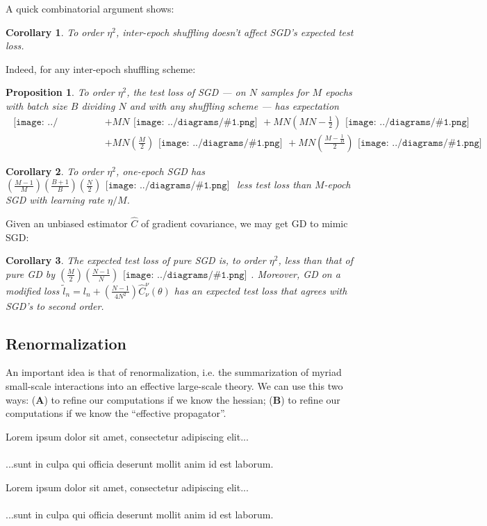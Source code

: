 \documentclass{article}
\newtheorem{cor}{Corollary}
\newtheorem{prop}{Proposition}
\newcommand{\wrap}[1]{\left( #1 \right)}
\newcommand{\mdia}[1]{\begin{gathered}\texttt{[image: ../diagrams/\#1.png]}\end{gathered}}
\newcommand{\sdia}[1]{\begin{gathered}\texttt{[image: ../diagrams/\#1.png]}\end{gathered}}
\newcommand{\lorem}[1]{
    Lorem ipsum dolor sit amet, consectetur adipiscing elit...\\
    \nopagebreak\vspace{#1cm} \ \\
    ...sunt in culpa qui officia deserunt mollit anim id est laborum.
}
\begin{document}
    A quick combinatorial argument shows:
    \begin{cor}
        To order $\eta^2$, inter-epoch shuffling doesn't affect SGD's
        expected test loss.
    \end{cor}
    Indeed, for any inter-epoch shuffling scheme: 
    \begin{prop}\label{prop:ordtwo}
        To order $\eta^2$, the test loss of SGD --- on $N$
        samples for $M$ epochs with batch size $B$ dividing $N$ and with any
        shuffling scheme --- has expectation
        {\small
        \begin{align*}
                                                    \mdia{(0)()}
            &+ MN                                   \mdia{(0-1)(01)}
             + MN\wrap{MN - \frac{1}{2}}            \mdia{(0-1-2)(01-12)} \\
            &+ MN\wrap{\frac{M}{2}}                 \mdia{c(01-2)(02-12)}  
             + MN\wrap{\frac{M-\frac{1}{B}}{2}}     \mdia{c(01-2)(01-12)}
        \end{align*}
        }
    \end{prop}

    \begin{cor}
        To order $\eta^2$, one-epoch SGD has 
        $
             \wrap{\frac{M-1}{M}}\wrap{\frac{B+1}{B}}\wrap{\frac{N}{2}} \mdia{c(01-2)(01-12)}
        $
        less test loss than $M$-epoch SGD with learning rate $\eta/M$. 
    \end{cor}

    Given an unbiased estimator $\hat{C}$ of gradient covariance, we may get
    GD to mimic SGD:
    \begin{cor}
        The expected test loss of pure SGD is, to order $\eta^2$,
        less than that of pure GD by
        $
              \wrap{\frac{M}{2}} \wrap{\frac{N-1}{N}} \sdia{c(01-2)(01-12)}
        $.
        Moreover, GD on a modified loss 
        $
            \tilde l_n = l_n + \wrap{\frac{N-1}{4N^2}} \hat{C}_\nu^\nu(\theta)
        $
        has an expected test loss that agrees with SGD's to second order.
    \end{cor}

\subsection{Renormalization}
    An important idea is that of renormalization, i.e. the summarization of  
    myriad small-scale interactions into an effective large-scale theory. 
    We can use this two ways:
        ({\bf A}) to refine our computations if we know the hessian;  
        ({\bf B}) to refine our computations if we know the ``effective propagator''.
    \lorem{3}
    \lorem{3}
\end{document}
